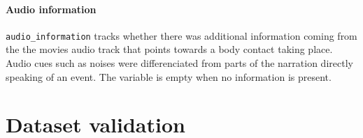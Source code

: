 \documentclass[10pt,a4paper,twocolumn]{article}
\begin{document}
\paragraph{Audio information}
\texttt{audio_information} tracks whether there was additional information coming from the the movies audio track that points towards a body contact taking place. Audio cues such as noises were differenciated from parts of the narration directly speaking of an event. The variable is empty when no information is present. 

\section*{Dataset validation}
\end{document}
